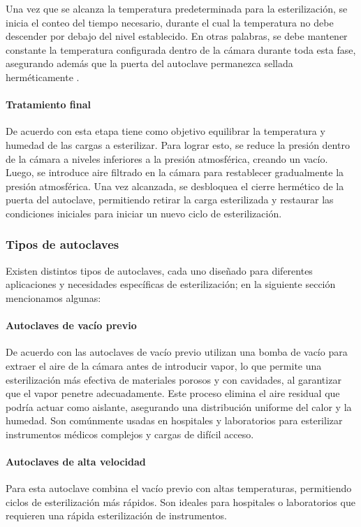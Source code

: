 Una vez que se alcanza la temperatura predeterminada para la esterilización, se inicia el conteo del tiempo necesario, durante el cual la temperatura no debe descender por debajo del nivel establecido. En otras palabras, se debe mantener constante la temperatura configurada dentro de la cámara durante toda esta fase, asegurando además que la puerta del autoclave permanezca sellada herméticamente \citep{funcionamiento2}.

\paragraph{Tratamiento final}
De acuerdo con \cite{funcionamiento} esta etapa tiene como objetivo equilibrar la temperatura y humedad de las cargas a esterilizar. Para lograr esto, se reduce la presión dentro de la cámara a niveles inferiores a la presión atmosférica, creando un vacío. Luego, se introduce aire filtrado en la cámara para restablecer gradualmente la presión atmosférica. Una vez alcanzada, se desbloquea el cierre hermético de la puerta del autoclave, permitiendo retirar la carga esterilizada y restaurar las condiciones iniciales para iniciar un nuevo ciclo de esterilización.

\subsubsection{Tipos de autoclaves}
Existen distintos tipos de autoclaves, cada uno diseñado para diferentes aplicaciones y necesidades específicas de esterilización; en la siguiente sección mencionamos algunas:
 
\paragraph{Autoclaves de vacío previo}
De acuerdo con \cite{medina} las autoclaves de vacío previo utilizan una bomba de vacío para extraer el aire de la cámara antes de introducir vapor, lo que permite una esterilización más efectiva de materiales porosos y con cavidades, al garantizar que el vapor penetre adecuadamente. Este proceso elimina el aire residual que podría actuar como aislante, asegurando una distribución uniforme del calor y la humedad. Son comúnmente usadas en hospitales y laboratorios para esterilizar instrumentos médicos complejos y cargas de difícil acceso.

\paragraph{Autoclaves de alta velocidad }
Para \cite{altavelocidad} esta autoclave combina el vacío previo con altas temperaturas, permitiendo ciclos de esterilización más rápidos. Son ideales para hospitales o laboratorios que requieren una rápida esterilización de instrumentos.

